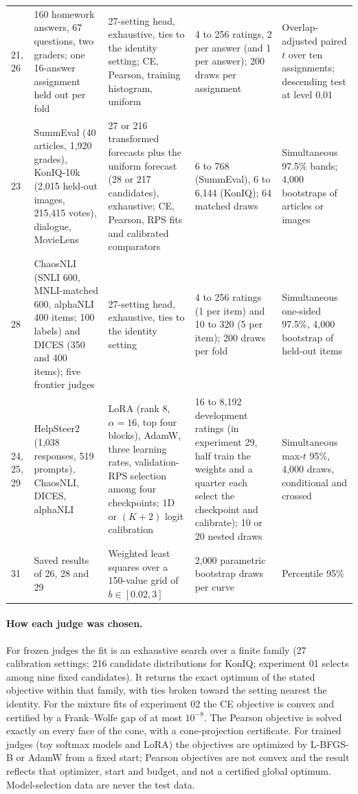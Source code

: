 \begin{table}[t]
\begin{tabular}{@{}p{}p{}p{}p{}p{}@{}}
21, 26 & 160 homework answers, 67 questions, two graders; one 16-answer assignment held out per fold & 27-setting head, exhaustive, ties to the identity setting; CE, Pearson, training histogram, uniform & 4 to 256 ratings, 2 per answer (and 1 per answer); 200 draws per assignment & Overlap-adjusted paired $t$ over ten assignments; descending test at level 0.01 \\
23 & SummEval (40 articles, 1{,}920 grades), KonIQ-10k (2{,}015 held-out images, 215{,}415 votes), dialogue, MovieLens & 27 or 216 transformed forecasts plus the uniform forecast (28 or 217 candidates), exhaustive; CE, Pearson, RPS fits and calibrated comparators & 6 to 768 (SummEval), 6 to 6{,}144 (KonIQ); 64 matched draws & Simultaneous 97.5\% bands; 4{,}000 bootstraps of articles or images \\
28 & ChaosNLI (SNLI 600, MNLI-matched 600, alphaNLI 400 items; 100 labels) and DICES (350 and 400 items); five frontier judges & 27-setting head, exhaustive, ties to the identity setting & 4 to 256 ratings (1 per item) and 10 to 320 (5 per item); 200 draws per fold & Simultaneous one-sided 97.5\%, 4{,}000 bootstrap of held-out items \\
24, 25, 29 & HelpSteer2 (1{,}038 responses, 519 prompts), ChaosNLI, DICES, alphaNLI & LoRA (rank 8, $\alpha=16$, top four blocks), AdamW, three learning rates, validation-RPS selection among four checkpoints; 1D or $(K+2)$ logit calibration & 16 to 8{,}192 development ratings (in experiment 29, half train the weights and a quarter each select the checkpoint and calibrate); 10 or 20 nested draws & Simultaneous max-$t$ 95\%, 4{,}000 draws, conditional and crossed \\
31 & Saved results of 26, 28 and 29 & Weighted least squares over a 150-value grid of $b\in[0.02,3]$ & 2{,}000 parametric bootstrap draws per curve & Percentile 95\% \\
\bottomrule
\end{tabular}
\end{table}

\paragraph{How each judge was chosen.}
For frozen judges the fit is an exhaustive search over a finite family (27 calibration settings; 216 candidate distributions for KonIQ; experiment 01 selects among nine fixed candidates). It returns the exact optimum of the stated objective within that family, with ties broken toward the setting nearest the identity. For the mixture fits of experiment 02 the CE objective is convex and certified by a Frank--Wolfe gap of at most $10^{-8}$. The Pearson objective is solved exactly on every face of the cone, with a cone-projection certificate.
For trained judges (toy softmax models and LoRA) the objectives are optimized by L-BFGS-B or AdamW from a fixed start; Pearson objectives are not convex and the result reflects that optimizer, start and budget, and not a certified global optimum.
Model-selection data are never the test data.
